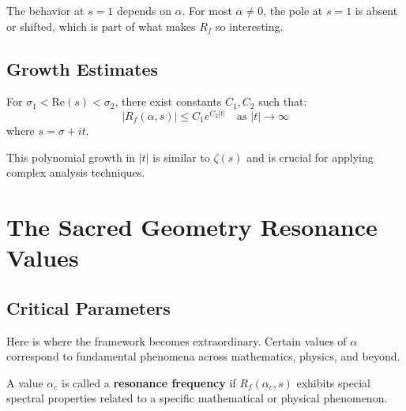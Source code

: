 The behavior at $s = 1$ depends on $\alpha$. For most $\alpha \neq 0$, the pole at $s=1$ is absent or shifted, which is part of what makes $R_f$ so interesting.

\subsection{Growth Estimates}

\begin{lemma}
For $\sigma_1 < \text{Re}(s) < \sigma_2$, there exist constants $C_1, C_2$ such that:
\begin{equation}
|R_f(\alpha, s)| \leq C_1 e^{C_2 |t|} \quad \text{as } |t| \to \infty
\end{equation}
where $s = \sigma + it$.
\end{lemma}

This polynomial growth in $|t|$ is similar to $\zeta(s)$ and is crucial for applying complex analysis techniques.

\section{The Sacred Geometry Resonance Values}
\label{sec:sacred-geometry}


\subsection{Critical Parameters}

Here is where the framework becomes extraordinary. Certain values of $\alpha$ correspond to fundamental phenomena across mathematics, physics, and beyond.

\begin{definition}
A value $\alpha_c$ is called a \textbf{resonance frequency} if $R_f(\alpha_c, s)$ exhibits special spectral properties related to a specific mathematical or physical phenomenon.
\end{definition}

